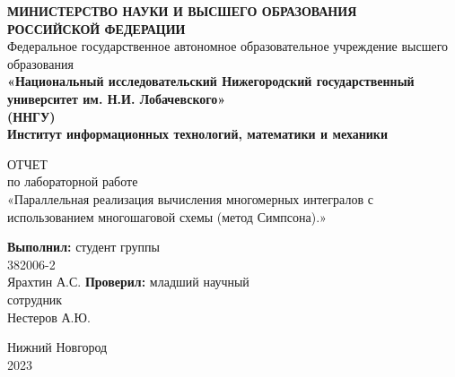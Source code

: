 \documentclass[14pt, a4paper]{extarticle}
\title{}
\author{}
\date{}
\begin{document}
  \begin{titlepage}
    \begin{center}
      {\bfseries МИНИСТЕРСТВО НАУКИ И ВЫСШЕГО ОБРАЗОВАНИЯ \\
        РОССИЙСКОЙ ФЕДЕРАЦИИ}
      \\
      Федеральное государственное автономное образовательное учреждение высшего образования
      \\
      {\bfseries «Национальный исследовательский Нижегородский государственный университет им. Н.И. Лобачевского»\\(ННГУ)
        \\Институт информационных технологий, математики и механики} \\
    \end{center}

    \vspace{8em}

    \begin{center}
      ОТЧЕТ \\ по лабораторной работе \\
      «Параллельная реализация вычисления многомерных интегралов с использованием многошаговой схемы (метод Симпсона).»
    \end{center}

    \vspace{5em}


    \begin{flushright}
      {\bfseries Выполнил:} студент группы\\382006-2\\Ярахтин А.С. \underline{\hspace{3cm}} \linebreak\linebreak\linebreak
      {\bfseries Проверил:} младший научный\\сотрудник\\Нестеров А.Ю. \underline{\hspace{3cm}} 
    \end{flushright}


    \vspace{\fill}

    \begin{center}
      Нижний Новгород\\2023
    \end{center}

  \end{titlepage}
\end{document}
